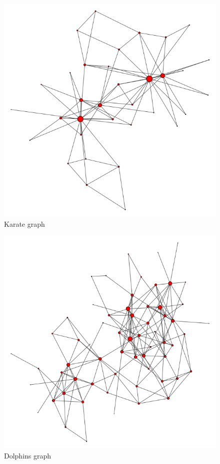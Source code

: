 \documentclass[11pt]{article}
\theoremstyle{definition}
\begin{document}
\begin{appendices}
\begin{figure}[h!]
  \centering
    \includegraphics[width=1\textwidth]{visualisations/karate_visual}
  \caption{Karate graph}
  \label{fig:karate}
\end{figure}

\begin{figure}[h!]
  \centering
    \includegraphics[width=1\textwidth]{visualisations/dolphins_visual}
  \caption{Dolphins graph}
  \label{fig:dolphins}
\end{figure}


\end{appendices}
\end{document}
